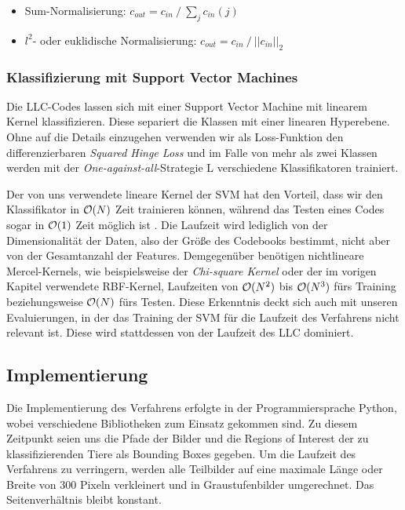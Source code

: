 \begin{itemize}
	\item Sum-Normalisierung: $c_{out} = c_{in}\: / \: \sum_j c_{in}(j)$
	\item $l^2$- oder euklidische Normalisierung: $c_{out} = c_{in}\: / \: ||c_{in}||_2$
\end{itemize}

\subsubsection{Klassifizierung mit Support Vector Machines}

Die LLC-Codes lassen sich mit einer Support Vector Machine mit linearem Kernel klassifizieren. Diese separiert die Klassen mit einer linearen Hyperebene. Ohne auf die Details einzugehen verwenden wir als Loss-Funktion den differenzierbaren \emph{Squared Hinge Loss} und im Falle von mehr als zwei Klassen werden mit der \emph{One-against-all}-Strategie L verschiedene Klassifikatoren trainiert.

Der von uns verwendete lineare Kernel der SVM hat den Vorteil, dass wir den Klassifikator in $\mathcal{O}(N)$ Zeit trainieren können, während das Testen eines Codes sogar in $\mathcal{O}(1)$ Zeit möglich ist \cite{yygh09}. Die Laufzeit wird lediglich von der Dimensionalität der Daten, also der Größe des Codebooks bestimmt, nicht aber von der Gesamtanzahl der Features. Demgegenüber benötigen nichtlineare Mercel-Kernels, wie beispielsweise der \emph{Chi-square Kernel} oder der im vorigen Kapitel verwendete RBF-Kernel, Laufzeiten von $\mathcal{O}(N^2)$ bis $\mathcal{O}(N^3)$ fürs Training beziehungsweise $\mathcal{O}(N)$ fürs Testen. Diese Erkenntnis deckt sich auch mit unseren Evaluierungen, in der das Training der SVM für die Laufzeit des Verfahrens nicht relevant ist. Diese wird stattdessen von der Laufzeit des LLC dominiert.

\subsection{Implementierung}

Die Implementierung des Verfahrens erfolgte in der Programmiersprache Python, wobei verschiedene Bibliotheken zum Einsatz gekommen sind. Zu diesem Zeitpunkt seien uns die Pfade der Bilder und die Regions of Interest der zu klassifizierenden Tiere als Bounding Boxes gegeben. Um die Laufzeit des Verfahrens zu verringern, werden alle Teilbilder auf eine maximale Länge oder Breite von 300 Pixeln verkleinert und in Graustufenbilder umgerechnet. Das Seitenverhältnis bleibt konstant.

